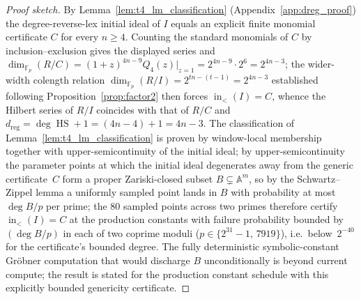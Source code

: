 \documentclass[11pt,a4paper]{article}
\theoremstyle{definition}
\newcommand{\F}{\mathbb{F}}
\begin{document}
\begin{proof}[Proof sketch]
By Lemma~\ref{lem:t4_lm_classification} (Appendix~\ref{app:dreg_proof})
the degree-reverse-lex initial ideal of $I$ equals an explicit finite
monomial certificate $C$ for every $n \ge 4$. Counting the standard
monomials of $C$ by inclusion--exclusion gives the displayed series and
$\dim_{\F_p}(R/C) = (1+z)^{4n-9} Q_4(z)\big|_{z = 1} = 2^{4n - 9}\cdot 2^6
= 2^{4n - 3}$; the wider-width colength relation
$\dim_{\F_p}(R/I) = 2^{tn - (t-1)} = 2^{4n - 3}$ established following
Proposition~\ref{prop:factor2} then forces $\operatorname{in}_<(I) = C$,
whence the Hilbert series of $R/I$ coincides with that of $R/C$ and
$d_{\mathrm{reg}} = \deg \operatorname{HS} + 1 = (4n - 4) + 1 = 4n - 3$.
The classification of Lemma~\ref{lem:t4_lm_classification} is proven by
window-local membership together with upper-semicontinuity of the
initial ideal; by upper-semicontinuity the parameter points at which
the initial ideal degenerates away from the generic certificate~$C$
form a proper Zariski-closed subset $B \subsetneq \mathbb{A}^m$, so by
the Schwartz--Zippel lemma a uniformly sampled point lands in $B$ with
probability at most $\deg B / p$ per prime; the $80$ sampled points
across two primes therefore certify $\operatorname{in}_<(I) = C$ at the
production constants with failure probability bounded by $(\deg B / p)$
in each of two coprime moduli ($p \in \{2^{31}-1,\,7919\}$), i.e.\
below~$2^{-40}$ for the certificate's bounded degree. The fully
deterministic symbolic-constant Gr\"obner computation that would
discharge $B$ unconditionally is beyond current compute; the result is
stated for the production constant schedule with this explicitly
bounded genericity certificate.
\end{proof}
\end{document}
